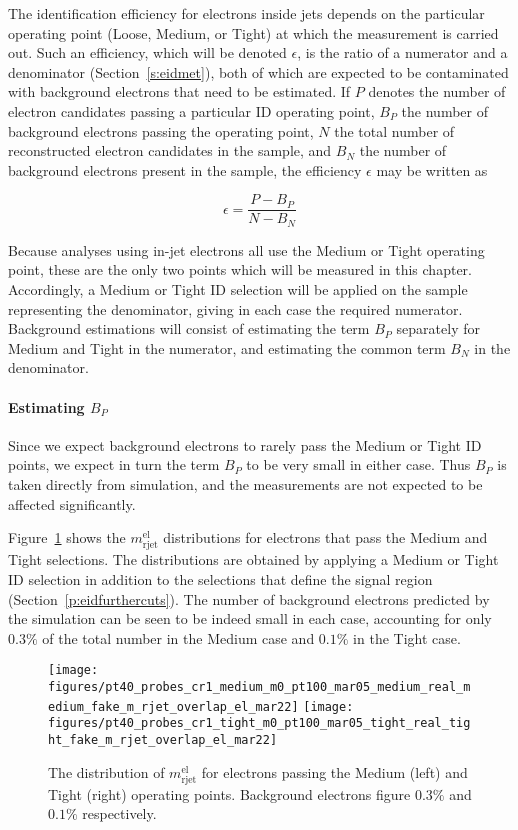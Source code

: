 The identification efficiency for electrons inside jets depends on the
particular operating point (Loose, Medium, or Tight) at which the measurement
is carried out. Such an efficiency, which will be denoted $\epsilon$, is the
ratio of a numerator and a denominator (Section~\ref{s:eidmet}), both of which
are expected to be contaminated with background electrons that need to be
estimated. If $P$ denotes the number of electron candidates passing a
particular ID operating point, $B_P$ the number of background electrons passing
the operating point, $N$ the total number of reconstructed electron candidates
in the sample, and $B_N$ the number of background electrons present in the
sample, the efficiency $\epsilon$ may be written as

\begin{equation}\label{eqn:effo}
	\epsilon = \frac{P-B_P}{N-B_N}
\end{equation}

Because analyses using in-jet electrons all use the Medium or Tight operating
point, these are the only two points which will be measured in this chapter.
Accordingly, a Medium or Tight ID selection will be applied on the sample
representing the denominator, giving in each case the required numerator.
Background estimations will consist of estimating the term $B_P$ separately for
Medium and Tight in the numerator, and estimating the common term $B_N$ in the
denominator.

\paragraph{Estimating $B_P$} Since we expect background electrons to rarely
pass the Medium or Tight ID points, we expect in turn the term $B_P$ to be very
small in either case. Thus $B_P$ is taken directly from simulation, and the
measurements are not expected to be affected significantly.

Figure~\ref{f:eidmedium} shows the $m_{\text{rjet}}^{\text{el}}$ distributions
for electrons that pass the Medium and Tight selections. The distributions are
obtained by applying a Medium or Tight ID selection in addition to the
selections that define the signal region (Section~\ref{p:eidfurthercuts}). The
number of background electrons predicted by the simulation can be seen to be
indeed small in each case, accounting for only $0.3\%$ of the total number in
the Medium case and $0.1\%$ in the Tight case.


\begin{figure}[H]
	\texttt{[image: figures/pt40\_probes\_cr1\_medium\_m0\_pt100\_mar05\_medium\_real\_medium\_fake\_m\_rjet\_overlap\_el\_mar22]}
	\texttt{[image: figures/pt40\_probes\_cr1\_tight\_m0\_pt100\_mar05\_tight\_real\_tight\_fake\_m\_rjet\_overlap\_el\_mar22]}

	\centering

	\caption{The distribution of $m_{\text{rjet}}^{\text{el}}$ for electrons passing
		the Medium (left) and Tight (right) operating points. Background electrons figure $0.3\%$ and
		$0.1\%$ respectively.}

	\label{f:eidmedium}

\end{figure}

